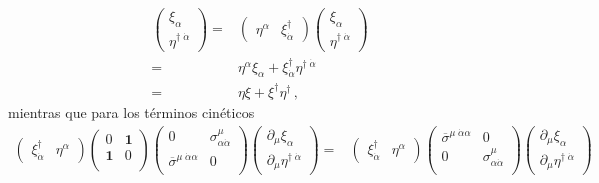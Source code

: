 \begin{frame}
\begin{align}
\begin{pmatrix}
   \xi_{\alpha}\\
   \eta^{\dagger\;\dot{\alpha}}    
  \end{pmatrix}
=&
\begin{pmatrix}
  \eta^{\alpha} & \xi^{\dagger}_{\dot{\alpha}}
\end{pmatrix}
\begin{pmatrix}
   \xi_{\alpha}\\
   \eta^{\dagger\;\dot{\alpha}}    
  \end{pmatrix}
\nonumber\\
=&\eta^{\alpha}\xi_{\alpha} +\xi^{\dagger}_{\dot{\alpha}}\eta^{\dagger\;\dot{\alpha}}\nonumber\\
=&\eta\xi+\xi^{\dagger}\eta^{\dagger}\,,
\end{align}
mientras que para los términos cinéticos
\begin{align}
\label{eq:psidd}
  \begin{pmatrix}
  \xi^{\dagger}_{\dot{\alpha}}& \eta^{\alpha}
  \end{pmatrix}
 \begin{pmatrix}
    0           &\mathbf{1}\\
    \mathbf{1} &0\\
  \end{pmatrix}
  \begin{pmatrix}
    0           &\sigma^{\mu}_{\alpha\dot{\alpha}}\\
    \overline{\sigma}^{\mu\;\dot{\alpha}\alpha} &0\\
  \end{pmatrix} \begin{pmatrix}
   \partial_{\mu}\xi_{\alpha}\\
   \partial_{\mu}\eta^{\dagger\;\dot{\alpha}}    
  \end{pmatrix}
=&
 \begin{pmatrix}
  \xi^{\dagger}_{\dot{\alpha}}& \eta^{\alpha}
  \end{pmatrix}
  \begin{pmatrix}
    \overline{\sigma}^{\mu\;\dot{\alpha}\alpha}&0\\
     0                    &\sigma^{\mu}_{\alpha\dot{\alpha}}\\
  \end{pmatrix} \begin{pmatrix}
   \partial_{\mu}\xi_{\alpha}\\
   \partial_{\mu}\eta^{\dagger\;\dot{\alpha}}    
  \end{pmatrix}\nonumber\\

\end{align}
\end{frame}

